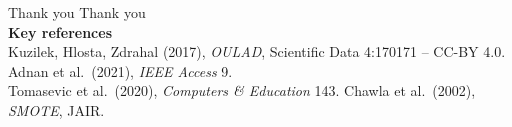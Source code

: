 \documentclass[aspectratio=169,10pt]{beamer}
\begin{document}
\begin{frame}{Thank you}
  \vfill\centering
  {\Huge \alert{Thank you}}\\[1.0em]
  {\footnotesize\textbf{Key references}}\\[0.3em]
  {\scriptsize
   Kuzilek, Hlosta, Zdrahal (2017), \emph{OULAD}, Scientific Data 4:170171 -- CC-BY 4.0.\quad
   Adnan et al.\ (2021), \emph{IEEE Access} 9.\\
   Tomasevic et al.\ (2020), \emph{Computers \& Education} 143.\quad
   Chawla et al.\ (2002), \emph{SMOTE}, JAIR.}
  \vfill
\end{frame}
\end{document}
